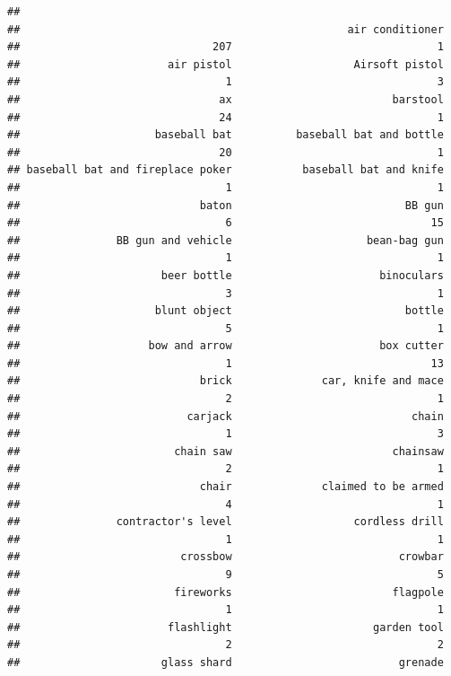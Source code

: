 \documentclass[
]{article}
\begin{document}
\begin{verbatim}
## 
##                                                   air conditioner 
##                              207                                1 
##                       air pistol                   Airsoft pistol 
##                                1                                3 
##                               ax                         barstool 
##                               24                                1 
##                     baseball bat          baseball bat and bottle 
##                               20                                1 
## baseball bat and fireplace poker           baseball bat and knife 
##                                1                                1 
##                            baton                           BB gun 
##                                6                               15 
##               BB gun and vehicle                     bean-bag gun 
##                                1                                1 
##                      beer bottle                       binoculars 
##                                3                                1 
##                     blunt object                           bottle 
##                                5                                1 
##                    bow and arrow                       box cutter 
##                                1                               13 
##                            brick              car, knife and mace 
##                                2                                1 
##                          carjack                            chain 
##                                1                                3 
##                        chain saw                         chainsaw 
##                                2                                1 
##                            chair              claimed to be armed 
##                                4                                1 
##               contractor's level                   cordless drill 
##                                1                                1 
##                         crossbow                          crowbar 
##                                9                                5 
##                        fireworks                         flagpole 
##                                1                                1 
##                       flashlight                      garden tool 
##                                2                                2 
##                      glass shard                          grenade 

\end{verbatim}
\end{document}
